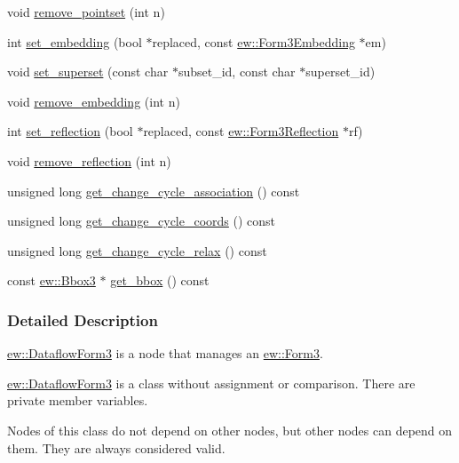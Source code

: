 \begin{DoxyCompactItemize}
\item 
void \hyperlink{classew_1_1DataflowForm3_a68f768e333b3bff1bf4d31d57974b160}{remove\_\-pointset} (int n)
\item 
int \hyperlink{classew_1_1DataflowForm3_a20f9365d1235407e6a9ddea3eff6bec3}{set\_\-embedding} (bool $\ast$replaced, const \hyperlink{classew_1_1Form3Embedding}{ew::Form3Embedding} $\ast$em)
\item 
void \hyperlink{classew_1_1DataflowForm3_a59ee4917704ef9d3d912bc48988c6239}{set\_\-superset} (const char $\ast$subset\_\-id, const char $\ast$superset\_\-id)
\item 
void \hyperlink{classew_1_1DataflowForm3_a88961709ad75d7dc70c0e4b9d23eac0c}{remove\_\-embedding} (int n)
\item 
int \hyperlink{classew_1_1DataflowForm3_a0f41241a4d9e418d124c791d77e578e8}{set\_\-reflection} (bool $\ast$replaced, const \hyperlink{classew_1_1Form3Reflection}{ew::Form3Reflection} $\ast$rf)
\item 
void \hyperlink{classew_1_1DataflowForm3_abbb32aecef2237f1901a787d2ec64283}{remove\_\-reflection} (int n)
\item 
unsigned long \hyperlink{classew_1_1DataflowForm3_abcf490e0af0eb5255bde9a0c9aab2805}{get\_\-change\_\-cycle\_\-association} () const 
\item 
unsigned long \hyperlink{classew_1_1DataflowForm3_a681592d654a425f8affadc82bb492e45}{get\_\-change\_\-cycle\_\-coords} () const 
\item 
unsigned long \hyperlink{classew_1_1DataflowForm3_aa05810f772580916a90f388c294811d2}{get\_\-change\_\-cycle\_\-relax} () const 
\item 
const \hyperlink{classew_1_1Bbox3}{ew::Bbox3} $\ast$ \hyperlink{classew_1_1DataflowForm3_aabe57915af91eba8b4c2d254acd4776d}{get\_\-bbox} () const 
\end{DoxyCompactItemize}


\subsubsection{Detailed Description}
\hyperlink{classew_1_1DataflowForm3}{ew::DataflowForm3} is a node that manages an \hyperlink{classew_1_1Form3}{ew::Form3}.

\hyperlink{classew_1_1DataflowForm3}{ew::DataflowForm3} is a class without assignment or comparison. There are private member variables.

Nodes of this class do not depend on other nodes, but other nodes can depend on them. They are always considered valid.

